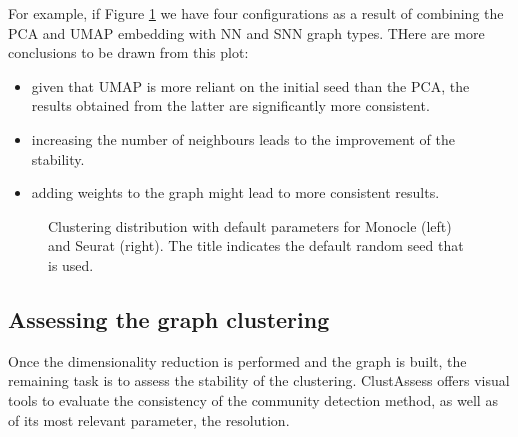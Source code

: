 For example, if Figure \ref{fig:ca-nn-ecc} we have four configurations as a result of combining the PCA and UMAP embedding with NN and SNN graph types. THere are more conclusions to be drawn from this plot:
\begin{itemize}
    \item given that UMAP is more reliant on the initial seed than the PCA, the results obtained from the latter are significantly more consistent.
    \item increasing the number of neighbours leads to the improvement of the stability.
    \item adding weights to the graph might lead to more consistent results.
\end{itemize}
\begin{figure}[H]
    \centering
    \caption{\label{fig:ca-nn-ecc}Clustering distribution with default parameters for Monocle (left) and Seurat (right). The title indicates the default random seed that is used.}
\end{figure}

\subsection{Assessing the graph clustering}
Once the dimensionality reduction is performed and the graph is built, the remaining task is to assess the stability of the clustering. ClustAssess offers visual tools to evaluate the consistency of the community detection method, as well as of its most relevant parameter, the resolution.

